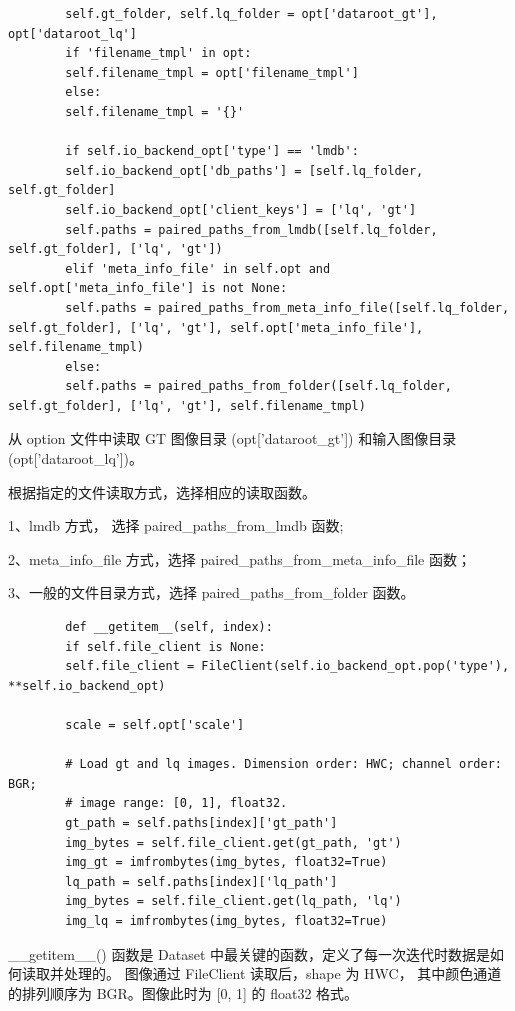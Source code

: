\documentclass[../main.tex]{subfiles}
\begin{document}
	
	\begin{verbatim}
		self.gt_folder, self.lq_folder = opt['dataroot_gt'], opt['dataroot_lq']
		if 'filename_tmpl' in opt:
		self.filename_tmpl = opt['filename_tmpl']
		else:
		self.filename_tmpl = '{}'
		
		if self.io_backend_opt['type'] == 'lmdb':
		self.io_backend_opt['db_paths'] = [self.lq_folder, self.gt_folder]
		self.io_backend_opt['client_keys'] = ['lq', 'gt']
		self.paths = paired_paths_from_lmdb([self.lq_folder, self.gt_folder], ['lq', 'gt'])
		elif 'meta_info_file' in self.opt and self.opt['meta_info_file'] is not None:
		self.paths = paired_paths_from_meta_info_file([self.lq_folder, self.gt_folder], ['lq', 'gt'], self.opt['meta_info_file'], self.filename_tmpl)
		else:
		self.paths = paired_paths_from_folder([self.lq_folder, self.gt_folder], ['lq', 'gt'], self.filename_tmpl)
	\end{verbatim}
	
	从 option 文件中读取 GT 图像目录 (opt['dataroot\_gt']) 和输入图像目录 (opt['dataroot\_lq'])。
	
	根据指定的文件读取方式，选择相应的读取函数。
	
	1、lmdb 方式， 选择 paired\_paths\_from\_lmdb 函数;
	
	2、meta\_info\_file 方式，选择 paired\_paths\_from\_meta\_info\_file 函数；
	
	3、一般的文件目录方式，选择 paired\_paths\_from\_folder 函数。
	
	\begin{verbatim}
		def __getitem__(self, index):
		if self.file_client is None:
		self.file_client = FileClient(self.io_backend_opt.pop('type'), **self.io_backend_opt)
		
		scale = self.opt['scale']
		
		# Load gt and lq images. Dimension order: HWC; channel order: BGR;
		# image range: [0, 1], float32.
		gt_path = self.paths[index]['gt_path']
		img_bytes = self.file_client.get(gt_path, 'gt')
		img_gt = imfrombytes(img_bytes, float32=True)
		lq_path = self.paths[index]['lq_path']
		img_bytes = self.file_client.get(lq_path, 'lq')
		img_lq = imfrombytes(img_bytes, float32=True)
	\end{verbatim}
	
	\_\_getitem\_\_() 函数是 Dataset 中最关键的函数，定义了每一次迭代时数据是如何读取并处理的。 图像通过 FileClient 读取后，shape 为 HWC， 其中颜色通道的排列顺序为 BGR。图像此时为 [0, 1] 的 float32 格式。
	
\end{document}
